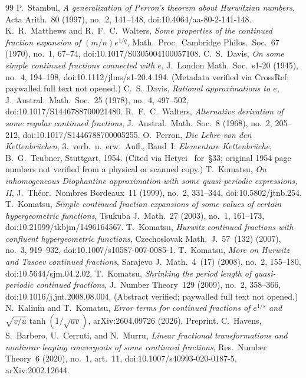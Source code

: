 \documentclass[11pt]{amsart}
\theoremstyle{definition}
\theoremstyle{remark}
\numberwithin{equation}{section}
\begin{document}
\begin{thebibliography}{99}
 P.~Stambul, \emph{A generalization of Perron's theorem about Hurwitzian numbers}, Acta Arith.~80 (1997), no.~2, 141--148, doi:10.4064/aa-80-2-141-148.
 K.~R.~Matthews and R.~F.~C.~Walters, \emph{Some properties of the continued fraction expansion of $(m/n)e^{1/q}$}, Math.~Proc.~Cambridge Philos.~Soc.~67 (1970), no.~1, 67--74, doi:10.1017/S0305004100057108.
 C.~S.~Davis, \emph{On some simple continued fractions connected with $e$}, J.~London Math.~Soc.~s1-20 (1945), no.~4, 194--198, doi:10.1112/jlms/s1-20.4.194. (Metadata verified via CrossRef; paywalled full text not opened.)
 C.~S.~Davis, \emph{Rational approximations to $e$}, J.~Austral.~Math.~Soc.~25 (1978), no.~4, 497--502, doi:10.1017/S1446788700021480.
 R.~F.~C.~Walters, \emph{Alternative derivation of some regular continued fractions}, J.~Austral.~Math.~Soc.~8 (1968), no.~2, 205--212, doi:10.1017/S1446788700005255.
 O.~Perron, \emph{Die Lehre von den Kettenbr\"uchen}, 3.~verb.~u.~erw.~Aufl., Band~I: \emph{Elementare Kettenbr\"uche}, B.~G.~Teubner, Stuttgart, 1954. (Cited via Hetyei~\cite[\S1.2, p.~4]{Hetyei2014} for~\S33; original 1954 page numbers not verified from a physical or scanned copy.)
 T.~Komatsu, \emph{On inhomogeneous Diophantine approximation with some quasi-periodic expressions, II}, J.~Th\'eor.~Nombres Bordeaux~11 (1999), no.~2, 331--344, doi:10.5802/jtnb.254.
 T.~Komatsu, \emph{Simple continued fraction expansions of some values of certain hypergeometric functions}, Tsukuba J.~Math.~27 (2003), no.~1, 161--173, doi:10.21099/tkbjm/1496164567.
 T.~Komatsu, \emph{Hurwitz continued fractions with confluent hypergeometric functions}, Czechoslovak Math.~J.~57~(132) (2007), no.~3, 919--932, doi:10.1007/s10587-007-0085-1.
 T.~Komatsu, \emph{More on Hurwitz and Tasoev continued fractions}, Sarajevo J.~Math.~4~(17) (2008), no.~2, 155--180, doi:10.5644/sjm.04.2.02.
 T.~Komatsu, \emph{Shrinking the period length of quasi-periodic continued fractions}, J.~Number Theory~129 (2009), no.~2, 358--366, doi:10.1016/j.jnt.2008.08.004. (Abstract verified; paywalled full text not opened.)
 N.~Kalinin and T.~Komatsu, \emph{Error terms for continued fractions of $e^{1/s}$ and $\sqrt{v/u}\tanh(1/\sqrt{uv})$}, arXiv:2604.09726 (2026). Preprint.
 C.~Havens, S.~Barbero, U.~Cerruti, and N.~Murru, \emph{Linear fractional transformations and nonlinear leaping convergents of some continued fractions}, Res.~Number Theory~6 (2020), no.~1, art.~11, doi:10.1007/s40993-020-0187-5, arXiv:2002.12644.

\end{thebibliography}
\end{document}
